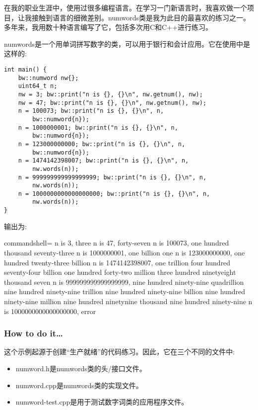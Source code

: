 
在我的职业生涯中，使用过很多编程语言。在学习一门新语言时，我喜欢做一个项目，让我接触到语言的细微差别。numwords类是我为此目的最喜欢的练习之一。多年来，我用数十种语言编写了它，包括多次用C和C++进行练习。

numwords是一个用单词拼写数字的类，可以用于银行和会计应用。它在使用中是这样的:

\begin{lstlisting}[style=styleCXX]
int main() {
	bw::numword nw{};
	uint64_t n;
	nw = 3; bw::print("n is {}, {}\n", nw.getnum(), nw);
	nw = 47; bw::print("n is {}, {}\n", nw.getnum(), nw);
	n = 100073; bw::print("n is {}, {}\n", n,
		bw::numword{n});
	n = 1000000001; bw::print("n is {}, {}\n", n,
		bw::numword{n});
	n = 123000000000; bw::print("n is {}, {}\n", n,
		bw::numword{n});
	n = 1474142398007; bw::print("n is {}, {}\n", n,
		nw.words(n));
	n = 999999999999999999; bw::print("n is {}, {}\n", n,
		nw.words(n));
	n = 1000000000000000000; bw::print("n is {}, {}\n", n,
		nw.words(n));
}
\end{lstlisting}

输出为:

\begin{tcblisting}{commandshell={}}
n is 3, three
n is 47, forty-seven
n is 100073, one hundred thousand seventy-three
n is 1000000001, one billion one
n is 123000000000, one hundred twenty-three billion
n is 1474142398007, one trillion four hundred seventy-four
billion one hundred forty-two million three hundred ninetyeight thousand seven
n is 999999999999999999, nine hundred ninety-nine quadrillion
nine hundred ninety-nine trillion nine hundred ninety-nine
billion nine hundred ninety-nine million nine hundred ninetynine thousand nine hundred ninety-nine
n is 1000000000000000000, error
\end{tcblisting}

\subsubsection{How to do it…}

这个示例起源于创建“生产就绪”的代码练习。因此，它在三个不同的文件中:

\begin{itemize}
\item 
numword.h是numwords类的头/接口文件。

\item 
numword.cpp是numwords类的实现文件。

\item 
numword-test.cpp是用于测试数字词类的应用程序文件。
\end{itemize}

